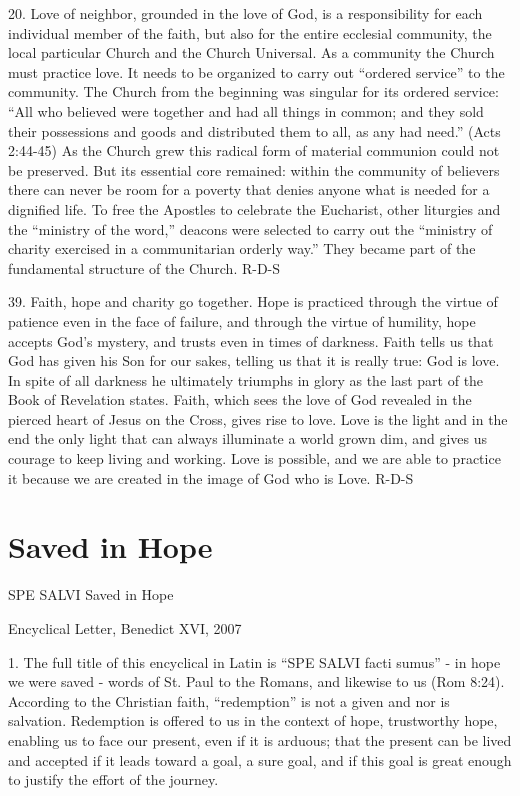 \documentclass[oneside]{book}
\begin{document}
20. Love of neighbor, grounded in the love of God, is a responsibility for each
individual member of the faith, but also for the entire ecclesial community, the
local particular Church and the Church Universal. As a community the Church must
practice love. It needs to be organized to carry out ``ordered service'' to the
community. The Church from the beginning was singular for its ordered service:
``All who believed were together and had all things in common; and they sold
their possessions and goods and distributed them to all, as any had need.''
(Acts 2:44-45)
As the Church grew this radical form of material communion could not be
preserved. But its essential core remained: within the community of believers
there can never be room for a poverty that denies anyone what is needed for a
dignified life. To free the Apostles to celebrate the Eucharist, other liturgies
and the ``ministry of the word,'' deacons were selected to carry out the
``ministry of charity exercised in a communitarian orderly way.'' They became
part of the fundamental structure of the Church.
R-D-S

39. Faith, hope and charity go together. Hope is practiced through the virtue of
patience even in the face of failure, and through the virtue of humility, hope
accepts God's mystery, and trusts even in times of darkness. Faith tells us that
God has given his Son for our sakes, telling us that it is really true: God is
love. In spite of all darkness he ultimately triumphs in glory as the last part
of the Book of Revelation states. Faith, which sees the love of God revealed in
the pierced heart of Jesus on the Cross, gives rise to love. Love is the light
and in the end the only light  that can always illuminate a world grown dim, and
gives us courage to keep living and working. Love is possible, and we are able
to practice it because we are created in the image of God who is Love.
R-D-S


\chapter{Saved in Hope}

SPE SALVI
Saved in Hope

Encyclical Letter, Benedict XVI, 2007


1. The full title of this encyclical in Latin is ``SPE SALVI facti sumus'' - in
hope we were saved - words of St. Paul to the Romans, and likewise to us (Rom
8:24). According to the Christian faith, ``redemption'' is not a given and nor
is salvation. Redemption is offered to us in the context of hope, trustworthy
hope, enabling us to face our present, even if it is arduous; that the present
can be lived and accepted if it leads toward a goal, a sure goal, and if this
goal is great enough to justify the effort of the journey.
\end{document}
